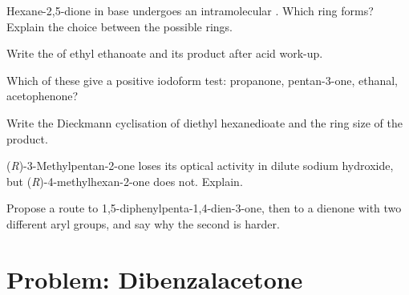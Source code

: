 \begin{exercise}[$\star\star$]\label{exo:b2:enolates-aldol:7}
Hexane-2,5-dione in base undergoes an intramolecular . Which ring forms? Explain the
choice between the possible rings.
\end{exercise}

\begin{exercise}[$\star\star$]\label{exo:b2:enolates-aldol:8}
Write the  of ethyl ethanoate and its product after acid work-up.
\end{exercise}

\begin{exercise}[$\star\star$]\label{exo:b2:enolates-aldol:9}
Which of these give a positive iodoform test: propanone, pentan-3-one, ethanal, acetophenone?
\end{exercise}

\begin{exercise}[$\star\star\star$]\label{exo:b2:enolates-aldol:10}
Write the Dieckmann cyclisation of diethyl hexanedioate and the ring size of the product.
\end{exercise}

\begin{exercise}[$\star\star\star$]\label{exo:b2:enolates-aldol:11}
(\textit{R})-3-Methylpentan-2-one loses its optical activity in dilute sodium hydroxide, but
(\textit{R})-4-methylhexan-2-one does not. Explain.
\end{exercise}

\begin{exercise}[$\star\star\star$]\label{exo:b2:enolates-aldol:12}
Propose a route to 1,5-diphenylpenta-1,4-dien-3-one, then to a dienone with two different aryl groups,
and say why the second is harder.
\end{exercise}

\section{Problem: Dibenzalacetone}

